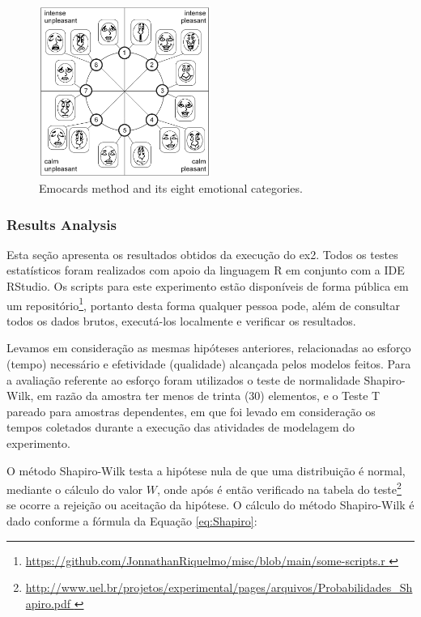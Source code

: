 \begin{figure}[!htb]
        \centering
        \caption{Emocards method and its eight emotional categories.}
        \label{fig:EmocardsMethod}
        \includegraphics[width=0.5\textwidth]{img/Emocards.png}
\end{figure}

\subsubsection{Results Analysis}

Esta seção apresenta os resultados obtidos da execução do \ac{ex2}.
Todos os testes estatísticos foram realizados com apoio da linguagem R em conjunto com a IDE RStudio. 
Os scripts para este experimento estão disponíveis de forma pública em um repositório\footnote{\url{ https://github.com/JonnathanRiquelmo/misc/blob/main/some-scripts.r }}, portanto desta forma qualquer pessoa pode, além de consultar todos os dados brutos, executá-los localmente e verificar os resultados.

Levamos em consideração as mesmas hipóteses anteriores, relacionadas ao esforço (tempo) necessário e efetividade (qualidade) alcançada pelos modelos feitos.
Para a avaliação referente ao esforço foram utilizados o teste de normalidade Shapiro-Wilk, em razão da amostra ter menos de trinta (30) elementos, e o Teste T pareado para amostras dependentes, em que foi levado em consideração os tempos coletados durante a execução das atividades de modelagem do experimento. 

O método Shapiro-Wilk testa a hipótese nula de que uma distribuição é normal, mediante o cálculo do valor $W$, onde após é então verificado na tabela do teste\footnote{\url{ http://www.uel.br/projetos/experimental/pages/arquivos/Probabilidades\_Shapiro.pdf }} se ocorre a rejeição ou aceitação da hipótese. 
O cálculo do método Shapiro-Wilk é dado conforme a fórmula da Equação \ref{eq:Shapiro}: 

